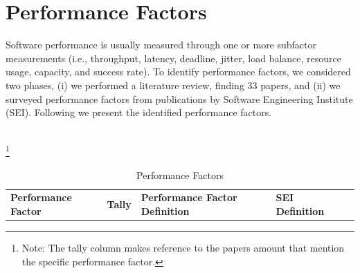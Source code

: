 \section{Performance Factors}
\label{sec:pfModel}
	Software performance is usually measured through one or more subfactor measurements (i.e., throughput,   latency, deadline, jitter, load balance, resource usage, capacity, and   success rate). To identify performance factors, we considered two phases, (i) we performed a literature review, finding 33 papers, and (ii) we surveyed performance factors from publications by Software Engineering Institute (SEI). Following we present the identified performance factors.\\
\\
{\scriptsize 
\footnote{Note: The tally column makes reference to the papers amount that mention the specific performance factor.}
\begin{longtable}[c]{|p{0.9in}|c|p{2.3in}|p{2.3in}|c}
	\caption{Performance Factors}\\
	\hhline{|-|-|-|-|}
	\label{tab:performanceFactors}
	\centering\textbf{Performance Factor}     & \textbf{Tally} & \centering\textbf{Performance Factor Definition}                                                                                                                                                                                                                                                                                                                                                                                                                                                                                                                                                                                                                           & \centering\textbf{SEI Definition}                                                                                                                                                                                                                                                                                                                                                                                                                                                                                                                                                                                                                                                                                                                               &   \\

\end{longtable}}
